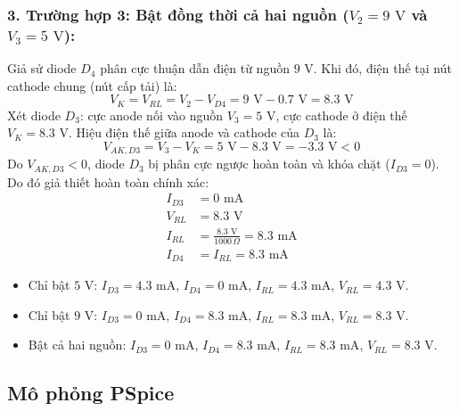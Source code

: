 \subsubsection*{3. Trường hợp 3: Bật đồng thời cả hai nguồn ($V_2 = 9\text{ V}$ và $V_3 = 5\text{ V}$):}
Giả sử diode $D_4$ phân cực thuận dẫn điện từ nguồn $9\text{ V}$. Khi đó, điện thế tại nút cathode chung (nút cấp tải) là:
\begin{equation}
  V_{K} = V_{RL} = V_2 - V_{D4} = 9\text{ V} - 0.7\text{ V} = 8.3\text{ V}
\end{equation}
Xét diode $D_3$: cực anode nối vào nguồn $V_3 = 5\text{ V}$, cực cathode ở điện thế $V_K = 8.3\text{ V}$. Hiệu điện thế giữa anode và cathode của $D_3$ là:
\begin{equation}
  V_{AK,D3} = V_3 - V_K = 5\text{ V} - 8.3\text{ V} = -3.3\text{ V} < 0
\end{equation}
Do $V_{AK,D3} < 0$, diode $D_3$ bị phân cực ngược hoàn toàn và khóa chặt ($I_{D3} = 0$). Do đó giả thiết hoàn toàn chính xác:
\begin{align*}
  I_{D3} &= 0\text{ mA} \\
  V_{RL} &= 8.3\text{ V} \\
  I_{RL} &= \frac{8.3\text{ V}}{1000\,\Omega} = 8.3\text{ mA} \\
  I_{D4} &= I_{RL} = 8.3\text{ mA}
\end{align*}

\begin{dapsobox}
  \begin{itemize}[leftmargin=1.5em]
    \item Chỉ bật $5\text{ V}$: $I_{D3} = 4.3\text{ mA}$, $I_{D4} = 0\text{ mA}$, $I_{RL} = 4.3\text{ mA}$, $V_{RL} = 4.3\text{ V}$.
    \item Chỉ bật $9\text{ V}$: $I_{D3} = 0\text{ mA}$, $I_{D4} = 8.3\text{ mA}$, $I_{RL} = 8.3\text{ mA}$, $V_{RL} = 8.3\text{ V}$.
    \item Bật cả hai nguồn: $I_{D3} = 0\text{ mA}$, $I_{D4} = 8.3\text{ mA}$, $I_{RL} = 8.3\text{ mA}$, $V_{RL} = 8.3\text{ V}$.
  \end{itemize}
\end{dapsobox}

\Needspace{0.66\textheight}
\subsection{Mô phỏng PSpice}
\simresult
{}

